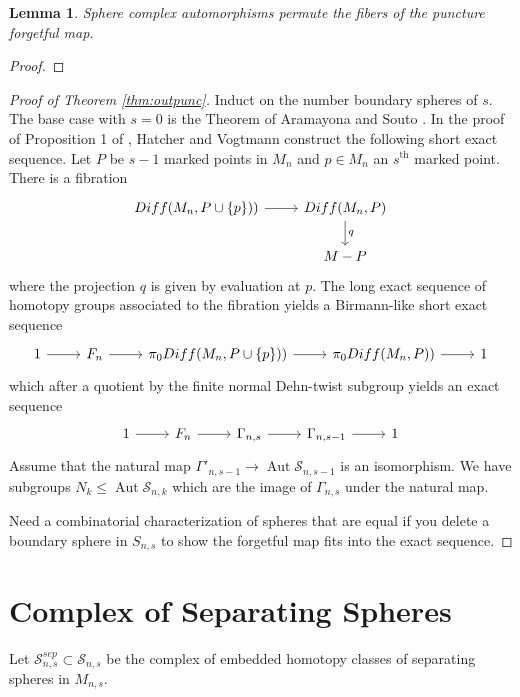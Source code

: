 \documentclass[11pt]{article}
\DeclareMathOperator{\aaut}{Aut}
\newtheorem{lemma}[theorem]{Lemma}
\theoremstyle{remark}
\theoremstyle{definition}
\begin{document}
\begin{lemma}
  Sphere complex automorphisms permute the fibers of the puncture forgetful map.
  \label{lemma:outfibers}
\end{lemma}

\begin{proof}
\end{proof}

\begin{proof}[Proof of Theorem \ref{thm:outpunc}]
Induct on the number boundary spheres of $s$.
The base case with $s=0$ is the Theorem of Aramayona and Souto \cite{souto}.
In the proof of Proposition 1 of \cite{MR1660045}, Hatcher and Vogtmann
construct the following short exact sequence.
Let $P$ be $s-1$ marked points in $M_n$ and $p \in M_n$ an $s^{\mbox{th}}$ marked point.
There is a fibration
$$
\begin{tikzcd}
Diff(M_n,P\cup \{p\})) \arrow[r]
& Diff(M_n,P) \arrow[d, "q"] \\
&M-P
\end{tikzcd}
$$
where the projection $q$ is given by evaluation at $p$.
The  long exact sequence of homotopy groups
associated to the fibration yields a Birmann-like short
exact sequence
$$
\begin{tikzcd}
  1 \arrow[r] &
  F_n \arrow[r] &
  \pi_0Diff(M_n,P\cup \{p\})) \arrow[r] &
  \pi_0Diff(M_n,P)) \arrow[r] &
  1
\end{tikzcd}
$$
which after a quotient by the finite normal Dehn-twist subgroup yields an exact sequence
$$
\begin{tikzcd}
  1 \arrow[r] &
  F_n \arrow[r] &
  \Gamma_{n,s} \arrow[r] &
  \Gamma_{n,s-1} \arrow[r] &
  1
\end{tikzcd}
$$
Assume that the natural map
$\Gamma'_{n,s-1} \to \aaut \mathcal S_{n,s-1}$ is an isomorphism.
We have subgroups $N_{k} \leq \aaut \mathcal S_{n,k}$
which are the image of $\Gamma_{n,s}$ under the natural map.

Need a combinatorial characterization of spheres that are equal if you delete
a boundary sphere in $S_{n,s}$ to show the forgetful map fits into the exact sequence.
\end{proof}




\section{Complex of Separating Spheres}

Let $\mathcal {S}^{sep}_{n,s} \subset \mathcal {S}_{n,s}$ be the complex of embedded homotopy classes of separating spheres
in $M_{n,s}$.\\
\end{document}
